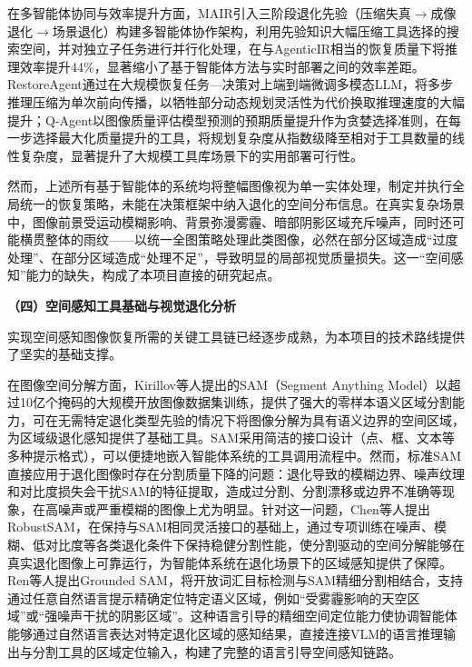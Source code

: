 在多智能体协同与效率提升方面，MAIR\cite{mair}引入三阶段退化先验（压缩失真$\to$成像退化$\to$场景退化）构建多智能体协作架构，利用先验知识大幅压缩工具选择的搜索空间，并对独立子任务进行并行化处理，在与AgenticIR相当的恢复质量下将推理效率提升44\%，显著缩小了基于智能体方法与实时部署之间的效率差距。RestoreAgent\cite{restoreagent}通过在大规模恢复任务---决策对上端到端微调多模态LLM，将多步推理压缩为单次前向传播，以牺牲部分动态规划灵活性为代价换取推理速度的大幅提升；Q-Agent\cite{qagent}以图像质量评估模型预测的预期质量提升作为贪婪选择准则，在每一步选择最大化质量提升的工具，将规划复杂度从指数级降至相对于工具数量的线性复杂度，显著提升了大规模工具库场景下的实用部署可行性。

然而，上述所有基于智能体的系统均将整幅图像视为单一实体处理，制定并执行全局统一的恢复策略，未能在决策框架中纳入退化的空间分布信息。在真实复杂场景中，图像前景受运动模糊影响、背景弥漫雾霾、暗部阴影区域充斥噪声，同时还可能横贯整体的雨纹——以统一全图策略处理此类图像，必然在部分区域造成“过度处理”、在部分区域造成“处理不足”，导致明显的局部视觉质量损失。这一“空间感知”能力的缺失，构成了本项目直接的研究起点。

\textbf{（四）空间感知工具基础与视觉退化分析}

实现空间感知图像恢复所需的关键工具链已经逐步成熟，为本项目的技术路线提供了坚实的基础支撑。

在图像空间分解方面，Kirillov等人\cite{sam}提出的SAM（Segment Anything Model）以超过10亿个掩码的大规模开放图像数据集训练，提供了强大的零样本语义区域分割能力，可在无需特定退化类型先验的情况下将图像分解为具有语义边界的空间区域，为区域级退化感知提供了基础工具。SAM采用简洁的接口设计（点、框、文本等多种提示格式），可以便捷地嵌入智能体系统的工具调用流程中。然而，标准SAM直接应用于退化图像时存在分割质量下降的问题：退化导致的模糊边界、噪声纹理和对比度损失会干扰SAM的特征提取，造成过分割、分割漂移或边界不准确等现象，在高噪声或严重模糊的图像上尤为明显。针对这一问题，Chen等人\cite{robustsam}提出RobustSAM，在保持与SAM相同灵活接口的基础上，通过专项训练在噪声、模糊、低对比度等各类退化条件下保持稳健分割性能，使分割驱动的空间分解能够在真实退化图像上可靠运行，为智能体系统在退化场景下的区域感知提供了保障。Ren等人\cite{grounded_sam}提出Grounded SAM，将开放词汇目标检测与SAM精细分割相结合，支持通过任意自然语言提示精确定位特定语义区域，例如“受雾霾影响的天空区域”或“强噪声干扰的阴影区域”。这种语言引导的精细空间定位能力使协调智能体能够通过自然语言表达对特定退化区域的感知结果，直接连接VLM的语言推理输出与分割工具的区域定位输入，构建了完整的语言引导空间感知链路。

